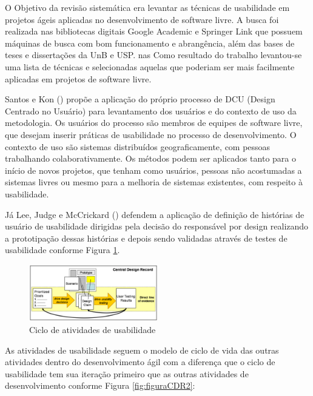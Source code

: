 O Objetivo da revisão sistemática era levantar as técnicas de usabilidade em projetos ágeis aplicadas no desenvolvimento de software livre. A busca foi realizada nas bibliotecas digitais Google Academic e Springer Link que possuem máquinas de busca com bom funcionamento e abrangência, além das bases de teses e dissertações da UnB e USP. nas Como resultado do trabalho levantou-se uma lista de técnicas e selecionadas aquelas que poderiam ser mais facilmente aplicadas em projetos de software livre.

%
Santos e Kon (\citeyear{santoskon2009}) propõe a aplicação do próprio processo de DCU (Design Centrado no Usuário) para levantamento dos usuários e do contexto de uso da metodologia. Os usuários do processo são membros de equipes de software livre, que desejam inserir práticas de usabilidade no processo de desenvolvimento. O contexto de uso são sistemas distribuídos geograficamente, com pessoas trabalhando colaborativamente. Os métodos podem ser aplicados tanto para o início de novos projetos, que tenham como usuários, pessoas não acostumadas a sistemas livres ou mesmo para a melhoria de sistemas existentes, com respeito à usabilidade.

%
Já Lee, Judge e McCrickard (\citeyear{lee2011}) defendem a aplicação de definição de histórias de usuário de usabilidade dirigidas pela decisão do responsável por design realizando a prototipação dessas histórias e depois sendo validadas através de testes de usabilidade conforme Figura \ref{fig:figuraCDR}.

\begin{figure}[H]
  \begin{center}
    \includegraphics[width=0.5\textwidth]{figuras/figuraCDR.eps}
    \caption{Ciclo de atividades de usabilidade}
    \label{fig:figuraCDR}
  \end{center}
\end{figure}

%
As atividades de usabilidade seguem o modelo de ciclo de vida das outras atividades dentro do desenvolvimento ágil com a diferença que o ciclo de usabilidade tem sua iteração primeiro que as outras atividades de desenvolvimento conforme Figura \ref{fig:figuraCDR2}:


